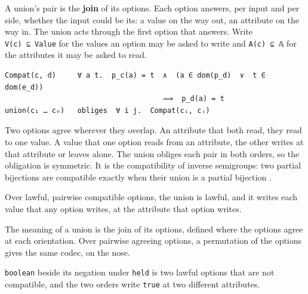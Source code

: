 A union's pair is the \textbf{join} of its options. Each option answers, per input and per side,
whether the input could be its: a value on the way out, an attribute on the way in. The union
acts through the first option that answers. Write \texttt{V(c)\ ⊆\ Value} for the values an option may be
asked to write and \texttt{A(c)\ ⊆\ 𝔸} for the attributes it may be asked to read.

\begin{definition}
\label{cond:compat}
\leanok
\begin{verbatim}
Compat(c, d)     ∀ a t.  p_c(a) = t  ∧  (a ∈ dom(p_d)  ∨  t ∈ dom(e_d))
                                     ⟹  p_d(a) = t
union(c₁ … cₙ)   obliges  ∀ i j.  Compat(cᵢ, cⱼ)
\end{verbatim}
Two options agree wherever they overlap. An attribute that both read, they read to one value. A
value that one option reads from an attribute, the other writes at that attribute or leaves alone.
The union obliges each pair in both orders, so the obligation is symmetric. It is the compatibility of inverse
semigroups: two partial bijections are compatible exactly when their union is a partial bijection
\cite{inverse-semigroups}.
\end{definition}

\begin{theorem}
\label{thm:join-lawful}
\leanok
Over lawful, pairwise compatible options, the union is lawful, and it writes each value that any
option writes, at the attribute that option writes.
\end{theorem}

\begin{theorem}
\label{thm:join-perm}
\leanok
The meaning of a union is the join of its options, defined where the options agree at each
orientation. Over pairwise agreeing options, a permutation of the options gives the same codec,
on the nose.
\end{theorem}

\begin{theorem}
\label{thm:join-order}
\leanok
\texttt{boolean} beside its negation under \texttt{held} is two lawful options that are not compatible,
and the two orders write \texttt{true} at two different attributes.
\end{theorem}

